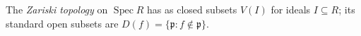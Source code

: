 
The \emph{Zariski topology} on $\operatorname{Spec}R$ has as closed subsets $V(I)$ for ideals $I\subseteq R$; its standard open subsets are $D(f)=\{\mathfrak p:f\notin\mathfrak p\}$.
